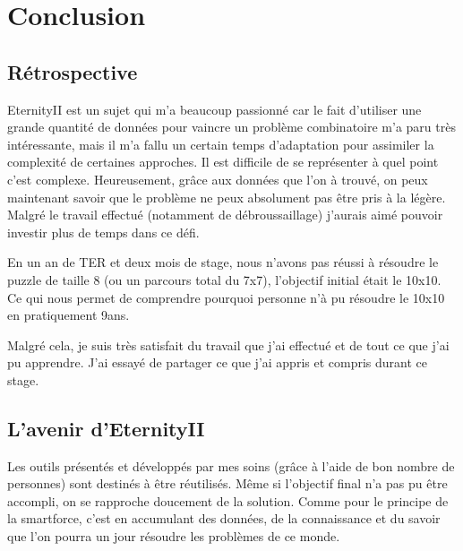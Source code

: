 \section{Conclusion}

\subsection{Rétrospective}

EternityII est un sujet qui m'a beaucoup passionné car le fait d'utiliser une grande quantité de données pour vaincre un problème combinatoire m'a paru très intéressante, mais il m'a fallu un certain temps d'adaptation pour assimiler la complexité de certaines approches. Il est difficile de se représenter à quel point c'est complexe. Heureusement, grâce aux données que l'on à trouvé, on peux maintenant savoir que le problème ne peux absolument pas être pris à la légère. Malgré le travail effectué (notamment de débroussaillage) j'aurais aimé pouvoir investir plus de temps dans ce défi.

En un an de TER et deux mois de stage, nous n'avons pas réussi à résoudre le puzzle de taille 8 (ou un parcours total du 7x7), l'objectif initial était le 10x10. Ce qui nous permet de comprendre pourquoi personne n'à pu résoudre le 10x10 en pratiquement 9ans.

Malgré cela, je suis très satisfait du travail que j'ai effectué et de tout ce que j'ai pu apprendre. J'ai essayé de partager ce que j'ai appris et compris durant ce stage.

\subsection{L'avenir d'EternityII}

Les outils présentés et développés par mes soins (grâce à l'aide de bon nombre de personnes) sont destinés à être réutilisés. Même si l'objectif final n'a pas pu être accompli, on se rapproche doucement de la solution. Comme pour le principe de la smartforce, c'est en accumulant des données, de la connaissance et du savoir que l'on pourra un jour résoudre les problèmes de ce monde.